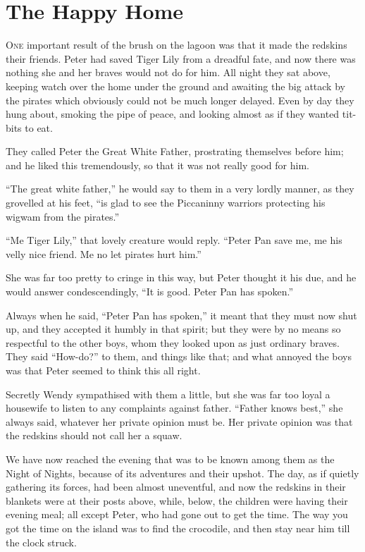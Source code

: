 \chapter{The Happy Home}

\lettrine{O}{ne} important result of the brush on the lagoon was that it made the
redskins their friends. Peter had saved Tiger Lily from a dreadful
fate, and now there was nothing she and her braves would not do for
him. All night they sat above, keeping watch over the home under the
ground and awaiting the big attack by the pirates which obviously could
not be much longer delayed. Even by day they hung about, smoking the
pipe of peace, and looking almost as if they wanted tit-bits to eat.

They called Peter the Great White Father, prostrating themselves before
him; and he liked this tremendously, so that it was not really good for
him.

``The great white father,'' he would say to them in a very lordly manner,
as they grovelled at his feet, ``is glad to see the Piccaninny warriors
protecting his wigwam from the pirates.''

``Me Tiger Lily,'' that lovely creature would reply. ``Peter Pan save me,
me his velly nice friend. Me no let pirates hurt him.''

She was far too pretty to cringe in this way, but Peter thought it his
due, and he would answer condescendingly, ``It is good. Peter Pan has
spoken.''

Always when he said, ``Peter Pan has spoken,'' it meant that they must
now shut up, and they accepted it humbly in that spirit; but they were
by no means so respectful to the other boys, whom they looked upon as
just ordinary braves. They said ``How-do?'' to them, and things like
that; and what annoyed the boys was that Peter seemed to think this all
right.

Secretly Wendy sympathised with them a little, but she was far too
loyal a housewife to listen to any complaints against father. ``Father
knows best,'' she always said, whatever her private opinion must be. Her
private opinion was that the redskins should not call her a squaw.

We have now reached the evening that was to be known among them as the
Night of Nights, because of its adventures and their upshot. The day,
as if quietly gathering its forces, had been almost uneventful, and now
the redskins in their blankets were at their posts above, while, below,
the children were having their evening meal; all except Peter, who had
gone out to get the time. The way you got the time on the island was to
find the crocodile, and then stay near him till the clock struck.

